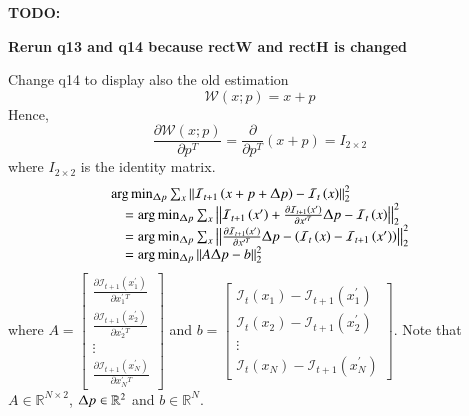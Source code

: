 \documentclass{scrbook}
\begin{document}
\textbf{TODO:}

\textbf{Rerun q13 and q14 because rectW and rectH is changed}

Change q14 to display also the old estimation
\begin{equation*}
\mathcal{W}\left(x;p\right)=x+p
\end{equation*}
Hence,
\begin{equation*}
\frac{\partial \mathcal{W}(x;p)}{\partial p^{T}}=\frac{\partial }{\partial p^{T}}\left(x+p\right)=I_{2\times 2}
\end{equation*}
where $I_{2\times 2}$ is the identity matrix.
\begin{equation*}
\begin{array}{ll}
\multicolumn{2}{l}{\arg \min _{\Updelta p} \sum _{x}{\left| \left| \mathcal{I}_{t+1}\left(x+p+\Updelta p\right)-\mathcal{I}_{t}\left(x\right)\right| \right| }_{2}^{2}}\\ & =\arg \min _{\Updelta p} \sum _{x}{\left| \left| \mathcal{I}_{t+1}\left(x'\right)+\frac{\partial \mathcal{I}_{t+1}\left(x'\right)}{\partial x'^{T}}\Updelta p-\mathcal{I}_{t}\left(x\right)\right| \right| }_{2}^{2}\\ & =\arg \min _{\Updelta p} \sum _{x}{\left| \left| \frac{\partial \mathcal{I}_{t+1}\left(x'\right)}{\partial x'^{T}}\Updelta p-\left(\mathcal{I}_{t}\left(x\right)-\mathcal{I}_{t+1}\left(x'\right)\right)\right| \right| }_{2}^{2}\\ & =\arg \min _{\Updelta p} {\left| \left| A\Updelta p-b\right| \right| }_{2}^{2}
\end{array}
\end{equation*}
where $A=\left[\begin{array}{c}
\frac{\partial \mathcal{I}_{t+1}\left({x}_{1}^{'}\right)}{\partial {x}_{1}^{'}^{T}}\\
\frac{\partial \mathcal{I}_{t+1}\left({x}_{2}^{'}\right)}{\partial {x}_{2}^{'}^{T}}\\
\vdots \\
\frac{\partial \mathcal{I}_{t+1}\left({x}_{N}^{'}\right)}{\partial {x}_{N}^{'}^{T}}
\end{array}\right]$ and $b=\left[\begin{array}{c}
\mathcal{I}_{t}\left(x_{1}\right)-\mathcal{I}_{t+1}\left({x}_{1}^{'}\right)\\
\mathcal{I}_{t}\left(x_{2}\right)-\mathcal{I}_{t+1}\left({x}_{2}^{'}\right)\\
\vdots \\
\mathcal{I}_{t}\left(x_{N}\right)-\mathcal{I}_{t+1}\left({x}_{N}^{'}\right)
\end{array}\right]$. Note that $A\in \mathbb{R}^{N\times 2}$, $\Updelta p\in \mathbb{R}^{2}$ and $b\in \mathbb{R}^{N}$.
\end{document}
